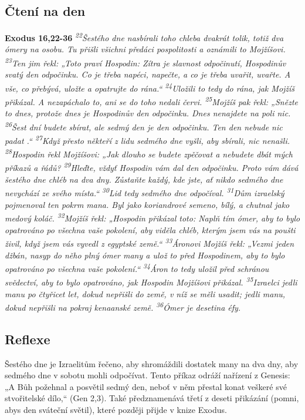 \documentclass[11pt]{article}
\begin{document}
\subsection*{Čtení na den}
\textbf{Exodus 16,22-36}
\newline
\textit{
\textsuperscript{22}Šestého dne nasbírali toho chleba dvakrát tolik, totiž dva ómery na osobu. Tu přišli všichni předáci pospolitosti a oznámili to Mojžíšovi.
\textsuperscript{23}Ten jim řekl: „Toto praví Hospodin: Zítra je slavnost odpočinutí, Hospodinův svatý den odpočinku. Co je třeba napéci, napečte, a co je třeba uvařit, uvařte. A vše, co přebývá, uložte a opatrujte do rána.“
\textsuperscript{24}Uložili to tedy do rána, jak Mojžíš přikázal. A nezapáchalo to, ani se do toho nedali červi.
\textsuperscript{25}Mojžíš pak řekl: „Snězte to dnes, protože dnes je Hospodinův den odpočinku. Dnes nenajdete na poli nic.
\textsuperscript{26}Šest dní budete sbírat, ale sedmý den je den odpočinku. Ten den nebude nic padat .“
\textsuperscript{27}Když přesto někteří z lidu sedmého dne vyšli, aby sbírali, nic nenašli.
\textsuperscript{28}Hospodin řekl Mojžíšovi: „Jak dlouho se budete zpěčovat a nebudete dbát mých příkazů a řádů?
\textsuperscript{29}Hleďte, vždyť Hospodin vám dal den odpočinku. Proto vám dává šestého dne chléb na dva dny. Zůstaňte každý, kde jste, ať nikdo sedmého dne nevychází ze svého místa.“
\textsuperscript{30}Lid tedy sedmého dne odpočíval.
\textsuperscript{31}Dům izraelský pojmenoval ten pokrm mana. Byl jako koriandrové semeno, bílý, a chutnal jako medový koláč.
\textsuperscript{32}Mojžíš řekl: „Hospodin přikázal toto: Naplň tím ómer, aby to bylo opatrováno po všechna vaše pokolení, aby viděla chléb, kterým jsem vás na poušti živil, když jsem vás vyvedl z egyptské země.“
\textsuperscript{33}Áronovi Mojžíš řekl: „Vezmi jeden džbán, nasyp do něho plný ómer many a ulož to před Hospodinem, aby to bylo opatrováno po všechna vaše pokolení.“
\textsuperscript{34}Áron to tedy uložil před schránou svědectví, aby to bylo opatrováno, jak Hospodin Mojžíšovi přikázal.
\textsuperscript{35}Izraelci jedli manu po čtyřicet let, dokud nepřišli do země, v níž se měli usadit; jedli manu, dokud nepřišli na pokraj kenaanské země.
\textsuperscript{36}Ómer je desetina éfy.
}

\subsection*{Reflexe}
Šestého dne je Izraelitům řečeno, aby shromáždili dostatek many na dva dny, aby sedmého dne v sobotu mohli
odpočívat. Tento příkaz odráží nařízení z Genesis: „A Bůh požehnal a posvětil sedmý den, neboť v něm přestal konat
veškeré své stvořitelské dílo,“ (Gen 2,3). Také předznamenává třetí z deseti přikázání (pomni, abys den sváteční světil),
které později přijde v knize Exodus.
\end{document}
